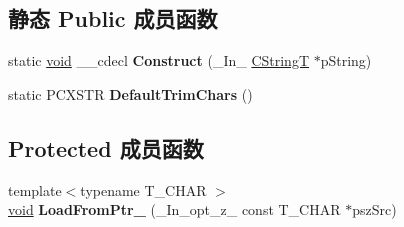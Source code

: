 \subsection*{静态 Public 成员函数}
\begin{DoxyCompactItemize}
\item 
\mbox{\label{class_a_t_l_1_1_c_string_t_a8c0d3d9ae0812f960ab79d23e058cf89}} 
static \hyperlink{interfacevoid}{void} \+\_\+\+\_\+cdecl {\bfseries Construct} (\+\_\+\+In\+\_\+ \hyperlink{class_a_t_l_1_1_c_string_t}{C\+StringT} $\ast$p\+String)
\item 
\mbox{\label{class_a_t_l_1_1_c_string_t_a2fa4798a85f600ed0954f03f5f88c512}} 
static P\+C\+X\+S\+TR {\bfseries Default\+Trim\+Chars} ()
\end{DoxyCompactItemize}
\subsection*{Protected 成员函数}
\begin{DoxyCompactItemize}
\item 
\mbox{\label{class_a_t_l_1_1_c_string_t_a12aeacf33acb1828288af31a2e1dd2de}} 
{\footnotesize template$<$typename T\+\_\+\+C\+H\+AR $>$ }\\\hyperlink{interfacevoid}{void} {\bfseries Load\+From\+Ptr\+\_\+} (\+\_\+\+In\+\_\+opt\+\_\+z\+\_\+ const T\+\_\+\+C\+H\+AR $\ast$psz\+Src)
\end{DoxyCompactItemize}
